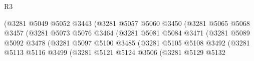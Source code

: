 \begin{lexlean}{R3}
\begin{coremodule}
                                            (@3281
                                              @5049
                                              @5052
                                              @3443
                                              (@3281
                                                @5057
                                                @5060
                                                @3450
                                                (@3281
                                                  @5065
                                                  @5068
                                                  @3457
                                                  (@3281
                                                    @5073
                                                    @5076
                                                    @3464
                                                    (@3281
                                                      @5081
                                                      @5084
                                                      @3471
                                                      (@3281
                                                        @5089
                                                        @5092
                                                        @3478
                                                        (@3281
                                                          @5097
                                                          @5100
                                                          @3485
                                                          (@3281
                                                            @5105
                                                            @5108
                                                            @3492
                                                            (@3281
                                                              @5113
                                                              @5116
                                                              @3499
                                                              (@3281
                                                                @5121
                                                                @5124
                                                                @3506
                                                                (@3281
                                                                  @5129
                                                                  @5132

\end{coremodule}
\end{lexlean}
